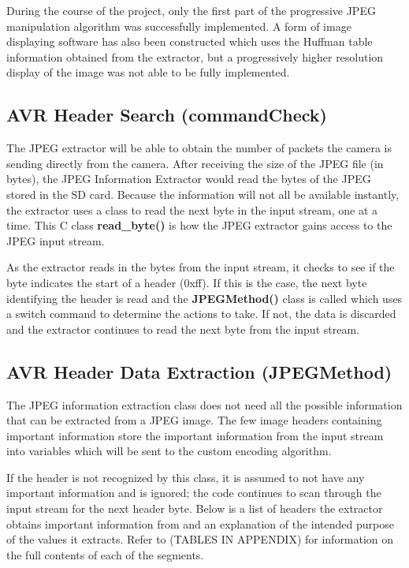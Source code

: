 During the course of the project, only the first part
of the progressive JPEG manipulation algorithm was 
successfully implemented. A form of image displaying 
software has also been constructed which uses the 
Huffman table information obtained from the extractor, 
but a progressively higher resolution display of 
the image was not able to be fully implemented.

\subsection{AVR Header Search (commandCheck)}

The JPEG extractor will be able to obtain the 
number of packets the camera is sending directly from the camera.
After receiving the size of the JPEG file (in bytes), 
the JPEG Information Extractor would read the bytes of the JPEG stored in the SD card. 
Because the information will not all be available instantly, 
the extractor uses a class to read the next byte in the input stream, one at a time. 
This C class \textbf{read\_byte()} is how the JPEG extractor 
gains access to the JPEG input stream. 

As the extractor reads in the bytes from the input stream, it checks to see if the byte indicates the start of a header (0xff). 
If this is the case, the next byte identifying the header is read and the \textbf{JPEGMethod()} class is 
called which uses a switch command to determine the actions to take. 
If not, the data is discarded and the extractor continues to read the next byte from the input stream. 

\subsection{AVR Header Data Extraction (JPEGMethod)}

The JPEG information extraction class does not need all the possible information that can be extracted from a JPEG image. 
The few image headers containing important information store the important information from the input stream into 
variables which will be sent to the custom encoding algorithm. 

If the header is not recognized by this class, 
it is assumed to not have any important information and is ignored; 
the code continues to scan through the input stream for the next header byte. 
Below is a list of headers the extractor obtains important information from 
and an explanation of the intended purpose of the values it extracts. 
Refer to (TABLES IN APPENDIX) for information on the full contents of each
of the segments.

